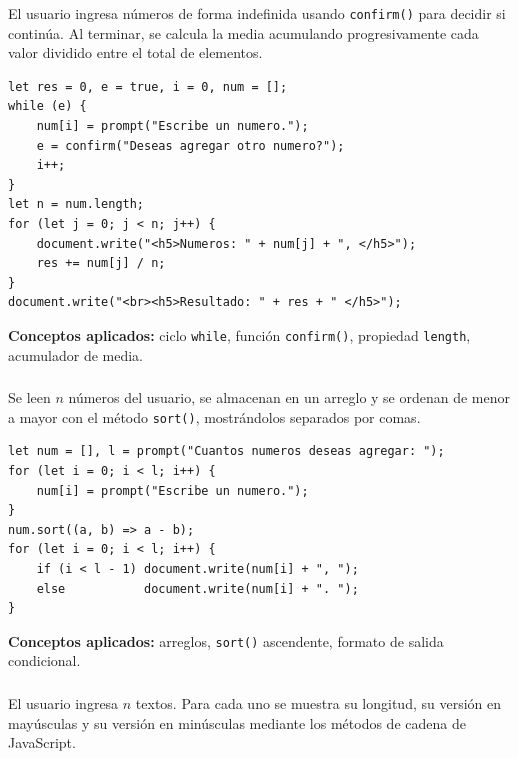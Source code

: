 \documentclass[10pt,a4paper]{article}
\begin{document}
El usuario ingresa números de forma indefinida usando \texttt{confirm()} para decidir si continúa. Al terminar, se calcula la media acumulando progresivamente cada valor dividido entre el total de elementos.

\begin{lstlisting}[style=jsStyle, caption={Ejercicio 6 -- Media aritmética}]
let res = 0, e = true, i = 0, num = [];
while (e) {
    num[i] = prompt("Escribe un numero.");
    e = confirm("Deseas agregar otro numero?");
    i++;
}
let n = num.length;
for (let j = 0; j < n; j++) {
    document.write("<h5>Numeros: " + num[j] + ", </h5>");
    res += num[j] / n;
}
document.write("<br><h5>Resultado: " + res + " </h5>");
\end{lstlisting}

\textbf{Conceptos aplicados:} ciclo \texttt{while}, función \texttt{confirm()}, propiedad \texttt{length}, acumulador de media.

\subsubsection{\color{colorESCOM}{Ejercicio 7: Ordenamiento de arreglo}}

Se leen $n$ números del usuario, se almacenan en un arreglo y se ordenan de menor a mayor con el método \texttt{sort()}, mostrándolos separados por comas.

\begin{lstlisting}[style=jsStyle, caption={Ejercicio 7 -- Ordenamiento de arreglo}]
let num = [], l = prompt("Cuantos numeros deseas agregar: ");
for (let i = 0; i < l; i++) {
    num[i] = prompt("Escribe un numero.");
}
num.sort((a, b) => a - b);
for (let i = 0; i < l; i++) {
    if (i < l - 1) document.write(num[i] + ", ");
    else           document.write(num[i] + ". ");
}
\end{lstlisting}

\textbf{Conceptos aplicados:} arreglos, \texttt{sort()} ascendente, formato de salida condicional.

\subsubsection{\color{colorESCOM}{Ejercicio 8: Análisis de cadenas de texto}}

El usuario ingresa $n$ textos. Para cada uno se muestra su longitud, su versión en mayúsculas y su versión en minúsculas mediante los métodos de cadena de JavaScript.
\end{document}
